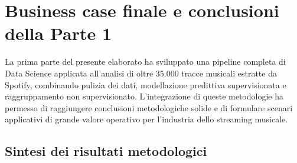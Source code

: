 \section{Business case finale e conclusioni della Parte 1}

La prima parte del presente elaborato ha sviluppato una pipeline completa di Data Science applicata all'analisi di oltre 35.000 tracce musicali estratte da Spotify, combinando pulizia dei dati, modellazione predittiva supervisionata e raggruppamento non supervisionato. L'integrazione di queste metodologie ha permesso di raggiungere conclusioni metodologiche solide e di formulare scenari applicativi di grande valore operativo per l'industria dello streaming musicale.

\subsection{Sintesi dei risultati metodologici}

